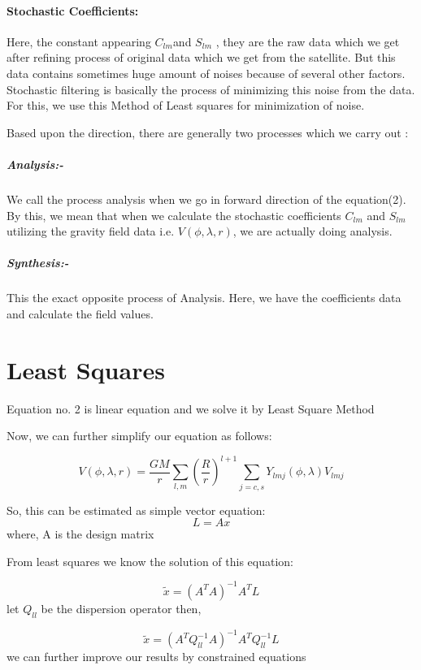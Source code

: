 \documentclass[a4paper,12pt]{article}
\begin{document}
\paragraph{Stochastic Coefficients:} 
Here, the constant appearing $C_{lm}$and $S_{lm}$ , they are the raw data which we get after refining process of original data which we get from the satellite. But this data contains sometimes huge amount of noises because of several other factors. Stochastic filtering is basically the process of minimizing this noise from the data. For this, we use this Method of Least squares for minimization of noise.

Based upon the direction, there are generally two processes which we carry out :

\subparagraph{Analysis:- }  We call the process analysis when we go in forward direction of the equation(2). By this, we mean that when we calculate the stochastic coefficients $C_{lm} $ and $S_{lm}$ utilizing the gravity field data i.e. $V(\phi,\lambda,r)$, we are actually doing analysis.
 \subparagraph{Synthesis:- } This the exact opposite process of Analysis. Here, we have the coefficients data and calculate the field values.
\section{Least Squares}
Equation no. 2 is linear equation and we solve it by Least Square Method

Now, we can further simplify our equation as follows:

\begin{equation}
V(\phi,\lambda,r)=\frac{GM}{r}\sum_{l,m}^{} \left(\frac{R}{r}\right)^{l+1}\sum_{j=c,s}^{}  Y_{lmj} (\phi,\lambda) V_{lmj}
\end{equation}

So, this can be estimated as simple vector equation:
\begin{equation}
  L= Ax  
\end{equation}
where, A is the design matrix

From least squares we know the solution of this equation:

\begin{equation}
\tilde{x} =(A^T A)^{-1} A^T L
\end{equation}
let $ Q_{ll}$ be the dispersion operator
then,

\begin{equation}
\tilde{x} =(A^T Q_{ll}^{-1} A)^{-1} A^T Q_{ll}^{-1} L
\end{equation}
 we can further improve our results by constrained equations
 
\end{document}
